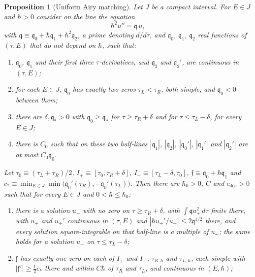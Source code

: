 \documentclass[aps,prd,onecolumn,tightenlines,nofootinbib,notitlepage,11pt,floatfix]{revtex4-2}
\theoremstyle{indentedtheorem}
\newtheorem{proposition}{Proposition}
\begin{document}
\begin{proposition}[Uniform Airy matching]\label{prop:matching}
Let $J$ be a compact interval. For $E\in J$ and $\hbar>0$ consider on the line the equation
\begin{equation*}
    \hbar^2u'' = \mathfrak{q}\,u ,
\end{equation*}
with $\mathfrak{q}\equiv\mathfrak{q}_0+\hbar\mathfrak{q}_1+\hbar^2\mathfrak{q}_2$, a prime denoting $d/d\tau$, and $\mathfrak{q}_0$, $\mathfrak{q}_1$, $\mathfrak{q}_2$ real functions of $(\tau,E)$ that do not depend on $\hbar$, such that:
\begin{enumerate}
\item[(U1)] $\mathfrak{q}_0$, $\mathfrak{q}_1$ and their first three $\tau$-derivatives, and $\mathfrak{q}_2$ and $\mathfrak{q}_2'$, are continuous in $(\tau,E)$;
\item[(U2)] for each $E\in J$, $\mathfrak{q}_0$ has exactly two zeros $\tau_L<\tau_R$, both simple, and $\mathfrak{q}_0<0$ between them;
\item[(U3)] there are $\delta,\mathfrak{q}_*>0$ with $\mathfrak{q}_0\geq\mathfrak{q}_*$ for $\tau\geq\tau_R+\delta$ and for $\tau\leq\tau_L-\delta$, for every $E\in J$;
\item[(U4)] there is $C_0$ such that on these two half-lines $|\mathfrak{q}_1|$, $|\mathfrak{q}_2|$, $|\mathfrak{q}_0'|$, $|\mathfrak{q}_1'|$ and $|\mathfrak{q}_2'|$ are at most $C_0\mathfrak{q}_0$.
\end{enumerate}
Let $\tau_0\equiv(\tau_L+\tau_R)/2$, $I_+\equiv[\tau_0,\tau_R+\delta]$, $I_-\equiv[\tau_L-\delta,\tau_0]$, $\mathfrak{f}\equiv\mathfrak{q}_0+\hbar\mathfrak{q}_1$ and $c_*\equiv\min_{E\in J}\min\big(\mathfrak{q}_0'(\tau_R),-\mathfrak{q}_0'(\tau_L)\big)$. Then there are $\hbar_0>0$, $C$ and $c_\text{dec}>0$ such that for every $E\in J$ and $0<\hbar\leq\hbar_0$:
\begin{enumerate}
\item[(M0)] there is a solution $u_+$ with no zero on $\tau\geq\tau_R+\delta$, with $\int\mathfrak{q}u_+^2\,d\tau$ finite there, with $u_+$ and $u_+'$ continuous in $(\tau,E)$ and $|\hbar u_+'/u_+|\leq2\mathfrak{q}^{1/2}$ there, and every solution square-integrable on that half-line is a multiple of $u_+$; the same holds for a solution $u_-$ on $\tau\leq\tau_L-\delta$;
\item[(M1)] $\mathfrak{f}$ has exactly one zero on each of $I_+$ and $I_-$, $\tau_{R,\hbar}$ and $\tau_{L,\hbar}$, each simple with $|\mathfrak{f}'|\geq\tfrac{1}{2}c_*$ there and within $C\hbar$ of $\tau_R$ and $\tau_L$, and continuous in $(E,\hbar)$;

\end{enumerate}
\end{proposition}
\end{document}
